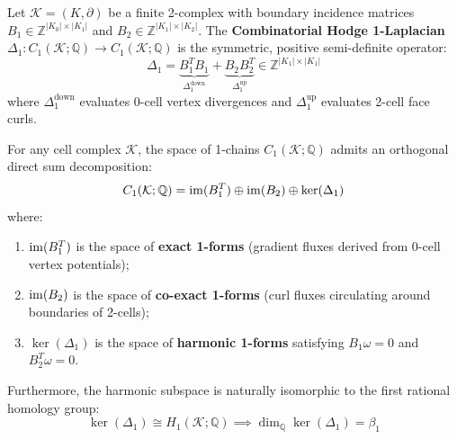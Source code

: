 \begin{definition}
Let $\mathcal{K} = (K, \partial)$ be a finite 2-complex with boundary incidence matrices $B_1 \in \mathbb{Z}^{|K_0| \times |K_1|}$ and $B_2 \in \mathbb{Z}^{|K_1| \times |K_2|}$. The \textbf{Combinatorial Hodge 1-Laplacian} $\Delta_1 : C_1(\mathcal{K}; \mathbb{Q}) \to C_1(\mathcal{K}; \mathbb{Q})$ is the symmetric, positive semi-definite operator:
\begin{equation}
    \Delta_1 = \underbrace{B_1^T B_1}_{\Delta_1^{\text{down}}} + \underbrace{B_2 B_2^T}_{\Delta_1^{\text{up}}} \in \mathbb{Z}^{|K_1| \times |K_1|}
\end{equation}
where $\Delta_1^{\text{down}}$ evaluates 0-cell vertex divergences and $\Delta_1^{\text{up}}$ evaluates 2-cell face curls.
\end{definition}

\begin{theorem}
\label{thm:discrete_hodge_decomp}
For any cell complex $\mathcal{K}$, the space of 1-chains $C_1(\mathcal{K}; \mathbb{Q})$ admits an orthogonal direct sum decomposition:
\begin{equation}
    C_1(\mathcal{K}; \mathbb{Q}) = \operatorname{im}(B_1^T) \oplus \operatorname{im}(B_2) \oplus \ker(\Delta_1)
\end{equation}
where:
\begin{enumerate}
    \item $\operatorname{im}(B_1^T)$ is the space of \textbf{exact 1-forms} (gradient fluxes derived from 0-cell vertex potentials);
    \item $\operatorname{im}(B_2)$ is the space of \textbf{co-exact 1-forms} (curl fluxes circulating around boundaries of 2-cells);
    \item $\ker(\Delta_1)$ is the space of \textbf{harmonic 1-forms} satisfying $B_1 \omega = 0$ and $B_2^T \omega = 0$.
\end{enumerate}
Furthermore, the harmonic subspace is naturally isomorphic to the first rational homology group:
\begin{equation}
    \ker(\Delta_1) \cong H_1(\mathcal{K}; \mathbb{Q}) \implies \dim_{\mathbb{Q}} \ker(\Delta_1) = \beta_1
\end{equation}
\end{theorem}

